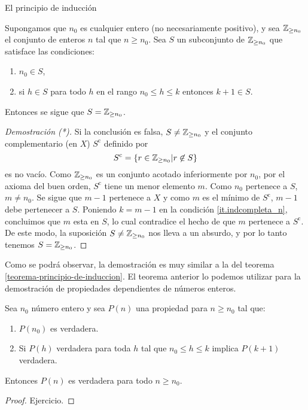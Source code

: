 \begin{section}{El principio de inducción}
\begin{teorema} Supongamos que $n_0$ es cualquier entero (no necesariamente positivo), y sea ${\mathbb Z}_{\ge n_0}$ el conjunto de enteros $n$ tal que $ n \ge n_0$. Sea $S$ un subconjunto de  ${\mathbb Z}_{\ge n_0}$ que satisface las condiciones: 
\begin{enumerate}[label=\textit{\alph*)}]
\item\label{it.indcompleta_1} $n_0 \in S$,
\item\label{it.indcompleta_n} si $h\in S$ para todo $h$ en el rango $n_0 \le h \le k$ entonces $k+1 \in S$.
\end{enumerate}
Entonces se sigue que $S= {\mathbb Z}_{\ge n_0}$.
\end{teorema}
\begin{proof}[Demostración (*)]
Si la conclusión es falsa, $S \not=  {\mathbb Z}_{\ge n_0}$ y el conjunto complementario (en $X$)  $S^{\text{c}}$ definido por
$$
S^{\text{c}}= \{ r \in  {\mathbb Z}_{\ge n_0} | r\not\in S\}
$$
es no vacío. Como $ {\mathbb Z}_{\ge n_0}$ es un conjunto acotado inferiormente por $n_0$, por el axioma del buen orden, $S^{\text{c}}$ tiene un menor elemento $m$. Como $n_0$ pertenece a $S$, $m\not=n_0$. Se sigue que $m-1$ pertenece a $X$ y como $m$ es el mínimo de $S^{\text{c}}$, $m-1$ debe pertenecer a $S$. Poniendo $k=m-1$ en la condición \ref{it.indcompleta_n}, concluimos que $m$ esta en $S$, lo cual contradice el hecho de que $m$ pertenece a $S^{\text{c}}$. De este modo, la suposición $S \not=  {\mathbb Z}_{\ge n_0}$ nos lleva a un absurdo, y por lo tanto tenemos $S=  {\mathbb Z}_{\ge n_0}$.
\end{proof}

Como se podrá observar, la demostración es muy similar a  la del teorema \ref{teorema-principio-de-induccion}. El teorema anterior lo podemos utilizar para la demostración de propiedades dependientes de números enteros.

\begin{teorema}\label{ind-completa} Sea $n_0$ número entero y sea $P(n)$ una propiedad para $n \ge n_0$ tal que:
\begin{enumerate}[label=\textit{\alph*)}]
\item $P(n_0)$ es verdadera.
\item Si $P(h)$ verdadera para toda $h$ tal que $n_0 \le h \le k$ implica $P(k + 1)$ verdadera.
\end{enumerate}
Entonces $P(n)$ es verdadera para todo $n \ge n_0$.
\end{teorema}
\begin{proof} Ejercicio.
\end{proof}




\end{section}
